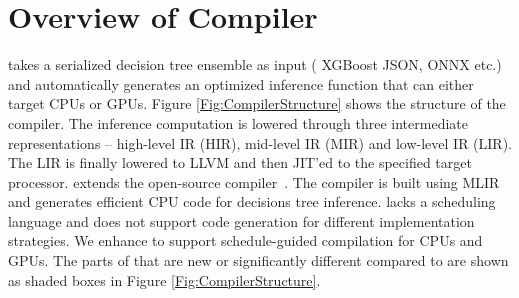 \section{Overview of \Treebeard{} Compiler}


\Treebeard{} takes a serialized decision tree ensemble as input (
XGBoost JSON, ONNX etc.) and automatically generates an optimized inference function
that can either target CPUs or GPUs. 
Figure \ref{Fig:CompilerStructure} shows the structure of the \Treebeard{} compiler. 
The inference computation is lowered through three intermediate representations
-- high-level IR (HIR), mid-level IR (MIR) and low-level IR (LIR). The LIR is
finally lowered to LLVM and then JIT'ed to the specified target processor. 
\Treebeard{} extends the open-source \TreebeardOLD{} compiler~\cite{Treebeard}.
The \TreebeardOLD{} compiler is built using MLIR~\cite{MLIR} and generates efficient CPU code for decisions tree inference.
\TreebeardOLD{} lacks a scheduling language and does not support code generation for 
different implementation strategies. We enhance \TreebeardOLD{}  
to support schedule-guided compilation for CPUs and GPUs.
The parts of \Treebeard{} that are new or significantly different compared to \TreebeardOLD{}
are shown as shaded boxes in Figure \ref{Fig:CompilerStructure}.

